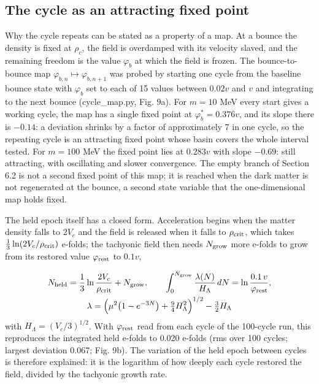\documentclass[pdflatex,sn-mathphys-num]{sn-jnl}
\begin{document}
\subsection{The cycle as an attracting fixed point}
Why the cycle repeats can be stated as a property of a map. At a bounce the density is fixed at $\rho_c$, the field is overdamped with its velocity slaved, and the remaining freedom is the value $\varphi_b$ at which the field is frozen. The bounce-to-bounce map $\varphi_{b,n}\mapsto\varphi_{b,n+1}$ was probed by starting one cycle from the baseline bounce state with $\varphi_b$ set to each of 15 values between $0.02v$ and $v$ and integrating to the next bounce (cycle\_map.py, Fig. 9a). For $m=10$ MeV every start gives a working cycle, the map has a single fixed point at $\varphi_b^*=0.376v$, and its slope there is $-0.14$: a deviation shrinks by a factor of approximately 7 in one cycle, so the repeating cycle is an attracting fixed point whose basin covers the whole interval tested. For $m=100$ MeV the fixed point lies at $0.283v$ with slope $-0.69$: still attracting, with oscillating and slower convergence. The empty branch of Section 6.2 is not a second fixed point of this map; it is reached when the dark matter is not regenerated at the bounce, a second state variable that the one-dimensional map holds fixed.

The held epoch itself has a closed form. Acceleration begins when the matter density falls to $2V_c$ and the field is released when it falls to $\rho_{\rm crit}$, which takes $\frac13\ln(2V_c/\rho_{\rm crit})$ e-folds; the tachyonic field then needs $N_{\rm grow}$ more e-folds to grow from its restored value $\varphi_{\rm rest}$ to $0.1v$,

\begin{equation}\begin{gathered}
N_{\rm held}=\frac{1}{3}\ln\frac{2V_c}{\rho_{\rm crit}}+N_{\rm grow},\qquad \int_0^{N_{\rm grow}}\frac{\lambda(N)}{H_\Lambda}\,dN=\ln\frac{0.1\,v}{\varphi_{\rm rest}},\\
\lambda=\Big(\mu^2\big(1-e^{-3N}\big)+\tfrac94H_\Lambda^2\Big)^{1/2}-\tfrac32H_\Lambda
\end{gathered}\end{equation}
with $H_\Lambda=(V_c/3)^{1/2}$. With $\varphi_{\rm rest}$ read from each cycle of the 100-cycle run, this reproduces the integrated held e-folds to 0.020 e-folds (rms over 100 cycles; largest deviation 0.067; Fig. 9b). The variation of the held epoch between cycles is therefore explained: it is the logarithm of how deeply each cycle restored the field, divided by the tachyonic growth rate.
\end{document}
